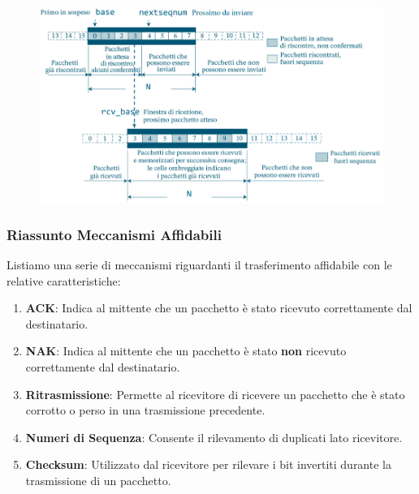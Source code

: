 \documentclass{article}
\begin{document}
\begin{figure}[htbp]
    \center
    \includegraphics[scale=0.55]{img/selectiveRepeat.png}
\end{figure}

\subsubsection{Riassunto Meccanismi Affidabili}

Listiamo una serie di meccanismi riguardanti il trasferimento affidabile con le relative caratteristiche:

\begin{enumerate}
    \item \textbf{ACK}: Indica al mittente che un pacchetto è stato ricevuto correttamente dal destinatario.
    \item \textbf{NAK}: Indica al mittente che un pacchetto è stato \textbf{non} ricevuto correttamente dal destinatario.
    \item \textbf{Ritrasmissione}: Permette al ricevitore di ricevere un pacchetto che è stato corrotto o perso in una trasmissione precedente.
    \item \textbf{Numeri di Sequenza}: Consente il rilevamento di duplicati lato ricevitore.
    \item \textbf{Checksum}: Utilizzato dal ricevitore per rilevare i bit invertiti durante la trasmissione di un pacchetto.
\end{enumerate}

\newpage

\end{document}
